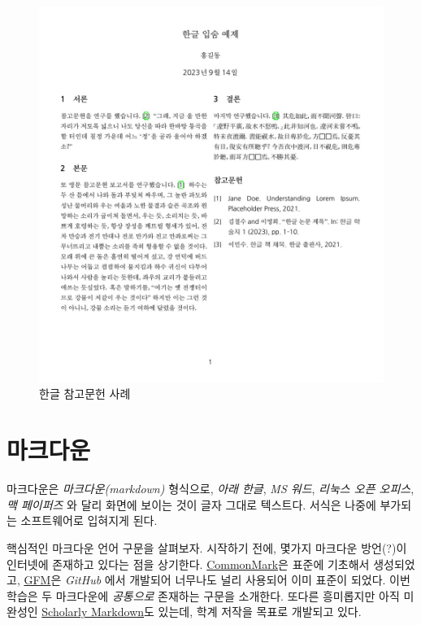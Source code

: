 \documentclass[
  letterpaper,
]{book}
\begin{document}
\begin{figure}

{\centering \includegraphics{images/pdf_korean_reference.jpg}

}

\caption{한글 참고문헌 사례}

\end{figure}

\hypertarget{uxb9c8uxd06cuxb2e4uxc6b4}{%
\chapter{마크다운}\label{uxb9c8uxd06cuxb2e4uxc6b4}}

마크다운은 \emph{마크다운(markdown)} 형식으로, \emph{아래 한글},
\emph{MS 워드}, \emph{리눅스 오픈 오피스}, \emph{맥 페이퍼즈} 와 달리
화면에 보이는 것이 글자 그대로 텍스트다. 서식은 나중에 부가되는
소프트웨어로 입혀지게 된다.

핵심적인 마크다운 언어 구문을 살펴보자. 시작하기 전에, 몇가지 마크다운
방언(?)이 인터넷에 존재하고 있다는 점을 상기한다.
\href{http://commonmark.org/}{CommonMark}은 표준에 기초해서 생성되었고,
\href{https://help.github.com/articles/github-flavored-markdown/}{GFM}은
\emph{GitHub} 에서 개발되어 너무나도 널리 사용되어 이미 표준이 되었다.
이번 학습은 두 마크다운에 \emph{공통으로} 존재하는 구문을 소개한다.
또다른 흥미롭지만 아직 미완성인
\href{http://scholarlymarkdown.com/}{Scholarly Markdown}도 있는데, 학계
저작을 목표로 개발되고 있다.
\end{document}

